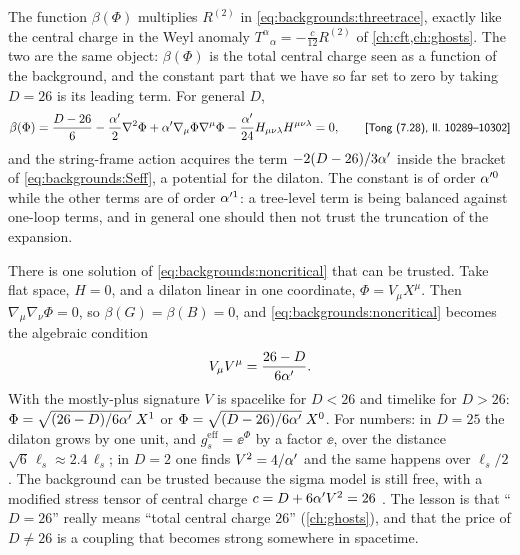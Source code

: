 The function $\beta(\Phi)$ multiplies $R^{(2)}$ in \eqref{eq:backgrounds:threetrace}, exactly
like the central charge in the Weyl anomaly $T^\alpha{}_\alpha=-\tfrac{c}{12}R^{(2)}$ of
\cref{ch:cft,ch:ghosts}. The two are the same object:
$\beta(\Phi)$ is the total central charge seen as a function of the background, and the
constant part that we have so far set to zero by taking $D=26$ is its leading term. For
general $D$,
\begin{equation}\label{eq:backgrounds:noncritical}
  \beta(\Phi)=\frac{D-26}{6}-\frac{\alpha'}{2}\nabla^2\Phi+\alpha'\nabla_\mu\Phi\nabla^\mu\Phi
  -\frac{\alpha'}{24}H_{\mu\nu\lambda}H^{\mu\nu\lambda}=0,
  \qquad\text{{\small\textsf{[Tong (7.28), ll.~10289--10302]}}}
\end{equation}
and the string-frame action acquires the term $-2(D-26)/3\alpha'$ inside the bracket of
\eqref{eq:backgrounds:Seff}, a potential for the dilaton. The constant is of order
$\alpha'^0$ while the other terms are of order $\alpha'^1$: a tree-level term is being balanced
against one-loop terms, and in general one should then not trust the truncation of the
expansion. 

\begin{example}\label{ex:backgrounds:lineardilaton}
There is one solution of \eqref{eq:backgrounds:noncritical} that can be trusted. Take flat
space, $H=0$, and a dilaton linear in one coordinate, $\Phi=V_\mu X^\mu$. Then
$\nabla_\mu\nabla_\nu\Phi=0$, so $\beta(G)=\beta(B)=0$, and
\eqref{eq:backgrounds:noncritical} becomes the algebraic condition
\begin{equation}\label{eq:backgrounds:lineardilaton}
  V_\mu V^\mu=\frac{26-D}{6\alpha'}.
\end{equation}
With the mostly-plus signature $V$ is spacelike for $D<26$ and timelike for $D>26$:
$\Phi=\sqrt{(26-D)/6\alpha'}\;X^1$ or $\Phi=\sqrt{(D-26)/6\alpha'}\;X^0$.
 For numbers: in $D=25$ the dilaton grows by one unit,
and $g_s^{\mathrm{eff}}=\ee^{\Phi}$ by a factor $\ee$, over the distance
$\sqrt{6}\,\ell_s\approx2.4\,\ell_s$; in $D=2$ one finds $V^2=4/\alpha'$ and the same happens over
$\ell_s/2$. The background can be trusted because the sigma model is still free, with a modified
stress tensor of central charge $c=D+6\alpha' V^2=26$ . The lesson is that ``$D=26$''
really means ``total central charge $26$'' (\cref{ch:ghosts}), and that the price of
$D\neq26$ is a coupling that becomes strong somewhere in spacetime.
\end{example}

